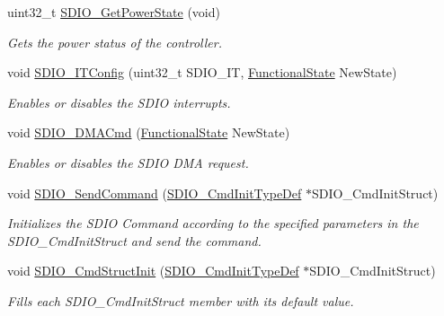 \begin{DoxyCompactItemize}
uint32\+\_\+t \hyperlink{group___s_d_i_o___exported___functions_ga3a19de2c7cd51645702213f64a1758ed}{S\+D\+I\+O\+\_\+\+Get\+Power\+State} (void)
\begin{DoxyCompactList}\small\item\em Gets the power status of the controller. \end{DoxyCompactList}\item 
void \hyperlink{group___s_d_i_o___exported___functions_ga208f51237ef43288735829dbaed37f00}{S\+D\+I\+O\+\_\+\+I\+T\+Config} (uint32\+\_\+t S\+D\+I\+O\+\_\+\+IT, \hyperlink{group___exported__types_gac9a7e9a35d2513ec15c3b537aaa4fba1}{Functional\+State} New\+State)
\begin{DoxyCompactList}\small\item\em Enables or disables the S\+D\+IO interrupts. \end{DoxyCompactList}\item 
void \hyperlink{group___s_d_i_o___exported___functions_gad36fde5ec0ce0c2089b9d971c2271e6e}{S\+D\+I\+O\+\_\+\+D\+M\+A\+Cmd} (\hyperlink{group___exported__types_gac9a7e9a35d2513ec15c3b537aaa4fba1}{Functional\+State} New\+State)
\begin{DoxyCompactList}\small\item\em Enables or disables the S\+D\+IO D\+MA request. \end{DoxyCompactList}\item 
void \hyperlink{group___s_d_i_o___exported___functions_ga7117d2f702703f6c0a66bc07707cab23}{S\+D\+I\+O\+\_\+\+Send\+Command} (\hyperlink{struct_s_d_i_o___cmd_init_type_def}{S\+D\+I\+O\+\_\+\+Cmd\+Init\+Type\+Def} $\ast$S\+D\+I\+O\+\_\+\+Cmd\+Init\+Struct)
\begin{DoxyCompactList}\small\item\em Initializes the S\+D\+IO Command according to the specified parameters in the S\+D\+I\+O\+\_\+\+Cmd\+Init\+Struct and send the command. \end{DoxyCompactList}\item 
void \hyperlink{group___s_d_i_o___exported___functions_ga09d9e89f49c87c82aec79c97b7068e24}{S\+D\+I\+O\+\_\+\+Cmd\+Struct\+Init} (\hyperlink{struct_s_d_i_o___cmd_init_type_def}{S\+D\+I\+O\+\_\+\+Cmd\+Init\+Type\+Def} $\ast$S\+D\+I\+O\+\_\+\+Cmd\+Init\+Struct)
\begin{DoxyCompactList}\small\item\em Fills each S\+D\+I\+O\+\_\+\+Cmd\+Init\+Struct member with its default value. \end{DoxyCompactList}\item 

\end{DoxyCompactItemize}
